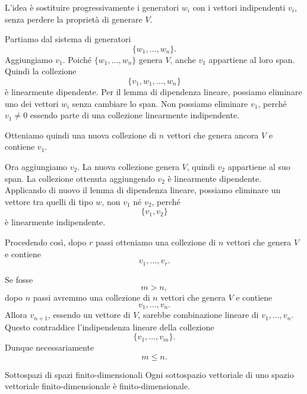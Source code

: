 \documentclass[a4paper]{article}
\begin{document}
\begin{snippetproof}{}
    L'idea è sostituire progressivamente i generatori \(w_i\) con i vettori indipendenti \(v_i\), senza perdere la proprietà di generare \(V\).

    Partiamo dal sistema di generatori
    \[
        \{w_1,\ldots,w_n\}.
    \]
    Aggiungiamo \(v_1\). Poiché \(\{w_1,\ldots,w_n\}\) genera \(V\), anche \(v_1\) appartiene al loro span. Quindi la collezione
    \[
        \{v_1,w_1,\ldots,w_n\}
    \]
    è linearmente dipendente. Per il lemma di dipendenza lineare, possiamo eliminare uno dei vettori \(w_i\) senza cambiare lo span. Non possiamo eliminare \(v_1\), perché \(v_1\neq 0\) essendo parte di una collezione linearmente indipendente.

    Otteniamo quindi una nuova collezione di \(n\) vettori che genera ancora \(V\) e contiene \(v_1\).

    Ora aggiungiamo \(v_2\). La nuova collezione genera \(V\), quindi \(v_2\) appartiene al suo span. La collezione ottenuta aggiungendo \(v_2\) è linearmente dipendente. Applicando di nuovo il lemma di dipendenza lineare, possiamo eliminare un vettore tra quelli di tipo \(w\), non \(v_1\) né \(v_2\), perché
    \[
        \{v_1,v_2\}
    \]
    è linearmente indipendente.

    Procedendo così, dopo \(r\) passi otteniamo una collezione di \(n\) vettori che genera \(V\) e contiene
    \[
        v_1,\ldots,v_r.
    \]

    Se fosse
    \[
        m>n,
    \]
    dopo \(n\) passi avremmo una collezione di \(n\) vettori che genera \(V\) e contiene
    \[
        v_1,\ldots,v_n.
    \]
    Allora \(v_{n+1}\), essendo un vettore di \(V\), sarebbe combinazione lineare di \(v_1,\ldots,v_n\). Questo contraddice l'indipendenza lineare della collezione
    \[
        \{v_1,\ldots,v_m\}.
    \]
    Dunque necessariamente
    \[
        m\leq n.
    \]
\end{snippetproof}

\begin{snippetcorollary}{Sottospazi di spazi finito-dimensionali}
    Ogni sottospazio vettoriale di uno spazio vettoriale finito-dimensionale è finito-dimensionale.
\end{snippetcorollary}
\end{document}
